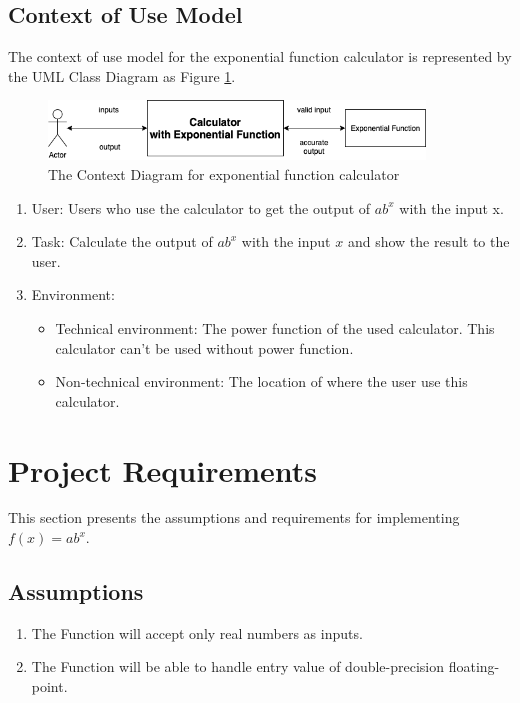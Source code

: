 \documentclass[11pt]{article}
\begin{document}
\subsection{Context of Use Model}
The context of use model for the exponential function calculator\cite{zelen1966application}\cite{lebanon2001boosting} is represented by the UML Class Diagram as Figure \ref{fig:context}.
\begin{figure}[h]
    \centering
    \includegraphics[width=10cm]{images/Context_diagram.png}
    \caption{The Context Diagram for exponential function calculator}
    \label{fig:context}
\end{figure}

\begin{enumerate}
\item User: Users who use the calculator to get the output of $ab^x$ with the input x.
\item Task: Calculate the output of $ab^x$ with the input $x$ and show the result to the user.
\item
Environment:
\begin{itemize}
\item Technical environment:
The power function of the used calculator. This calculator can't be used without power function.
\item Non-technical environment:
The location of where the user use this calculator.
\end{itemize}
\end{enumerate}

\section{Project Requirements}\label{problem2}
This section presents the assumptions and requirements\cite{iso2018ieee} for implementing $f(x)=ab^x$.
\subsection{Assumptions}
\begin{enumerate}
    \item The Function will accept only real numbers as inputs.
    \item The Function will be able to handle entry value of double-precision floating-point.
\end{enumerate}
\end{document}
